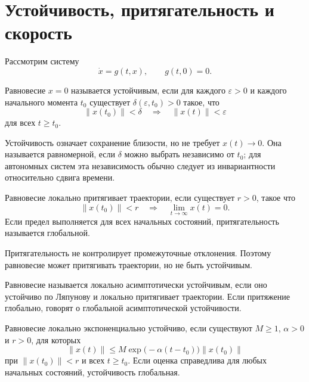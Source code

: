 \section{Устойчивость, притягательность и скорость}

Рассмотрим систему
\[
    \dot x=g(t,x),
    \qquad
    g(t,0)=0.
\]

\begin{definition}
Равновесие \(x=0\) называется устойчивым, если для каждого
\(\varepsilon>0\) и каждого начального момента \(t_0\) существует
\(\delta(\varepsilon,t_0)>0\) такое, что
\[
    \lVert x(t_0)\rVert<\delta
    \quad\Longrightarrow\quad
    \lVert x(t)\rVert<\varepsilon
\]
для всех \(t\ge t_0\).
\end{definition}

Устойчивость означает сохранение близости, но не требует
\(x(t)\to0\). Она называется равномерной, если \(\delta\) можно
выбрать независимо от \(t_0\); для автономных систем эта независимость
обычно следует из инвариантности относительно сдвига времени.

\begin{definition}[Притягательность]
Равновесие локально притягивает траектории, если существует \(r>0\),
такое что
\[
    \lVert x(t_0)\rVert<r
    \quad\Longrightarrow\quad
    \lim_{t\to\infty}x(t)=0.
\]
Если предел выполняется для всех начальных состояний,
притягательность называется глобальной.
\end{definition}

Притягательность не контролирует промежуточные отклонения. Поэтому
равновесие может притягивать траектории, но не быть устойчивым.

\begin{definition}
Равновесие называется локально асимптотически устойчивым, если оно
устойчиво по Ляпунову и локально притягивает траектории. Если
притяжение глобально, говорят о глобальной асимптотической
устойчивости.
\end{definition}

\begin{definition}
Равновесие локально экспоненциально устойчиво, если существуют
\(M\ge1\), \(\alpha>0\) и \(r>0\), для которых
\[
    \lVert x(t)\rVert
    \le
    M\exp\bigl(-\alpha(t-t_0)\bigr)
    \lVert x(t_0)\rVert
\]
при \(\lVert x(t_0)\rVert<r\) и всех \(t\ge t_0\). Если оценка
справедлива для любых начальных состояний, устойчивость глобальная.
\end{definition}


